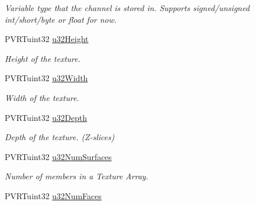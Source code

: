 \begin{DoxyCompactItemize}
\begin{DoxyCompactList}\small\item\em Variable type that the channel is stored in. Supports signed/unsigned int/short/byte or float for now. \end{DoxyCompactList}\item 
\hypertarget{struct_p_v_r_texture_header_v3_a9c5e715af399f08ffc05359d2624685a}{P\+V\+R\+Tuint32 \hyperlink{struct_p_v_r_texture_header_v3_a9c5e715af399f08ffc05359d2624685a}{u32\+Height}}\label{struct_p_v_r_texture_header_v3_a9c5e715af399f08ffc05359d2624685a}

\begin{DoxyCompactList}\small\item\em Height of the texture. \end{DoxyCompactList}\item 
\hypertarget{struct_p_v_r_texture_header_v3_ac0878cce242cd38c35a1aeb0a4cf66a6}{P\+V\+R\+Tuint32 \hyperlink{struct_p_v_r_texture_header_v3_ac0878cce242cd38c35a1aeb0a4cf66a6}{u32\+Width}}\label{struct_p_v_r_texture_header_v3_ac0878cce242cd38c35a1aeb0a4cf66a6}

\begin{DoxyCompactList}\small\item\em Width of the texture. \end{DoxyCompactList}\item 
\hypertarget{struct_p_v_r_texture_header_v3_a501a49dfec89a8c45554e16335b7b12b}{P\+V\+R\+Tuint32 \hyperlink{struct_p_v_r_texture_header_v3_a501a49dfec89a8c45554e16335b7b12b}{u32\+Depth}}\label{struct_p_v_r_texture_header_v3_a501a49dfec89a8c45554e16335b7b12b}

\begin{DoxyCompactList}\small\item\em Depth of the texture. (Z-\/slices) \end{DoxyCompactList}\item 
\hypertarget{struct_p_v_r_texture_header_v3_a1d924c6dd065bdad417a8d0d7197ca20}{P\+V\+R\+Tuint32 \hyperlink{struct_p_v_r_texture_header_v3_a1d924c6dd065bdad417a8d0d7197ca20}{u32\+Num\+Surfaces}}\label{struct_p_v_r_texture_header_v3_a1d924c6dd065bdad417a8d0d7197ca20}

\begin{DoxyCompactList}\small\item\em Number of members in a Texture Array. \end{DoxyCompactList}\item 
\hypertarget{struct_p_v_r_texture_header_v3_a6cd62813c77c3e1d0b3cc2ef938536d2}{P\+V\+R\+Tuint32 \hyperlink{struct_p_v_r_texture_header_v3_a6cd62813c77c3e1d0b3cc2ef938536d2}{u32\+Num\+Faces}}\label{struct_p_v_r_texture_header_v3_a6cd62813c77c3e1d0b3cc2ef938536d2}


\end{DoxyCompactItemize}
